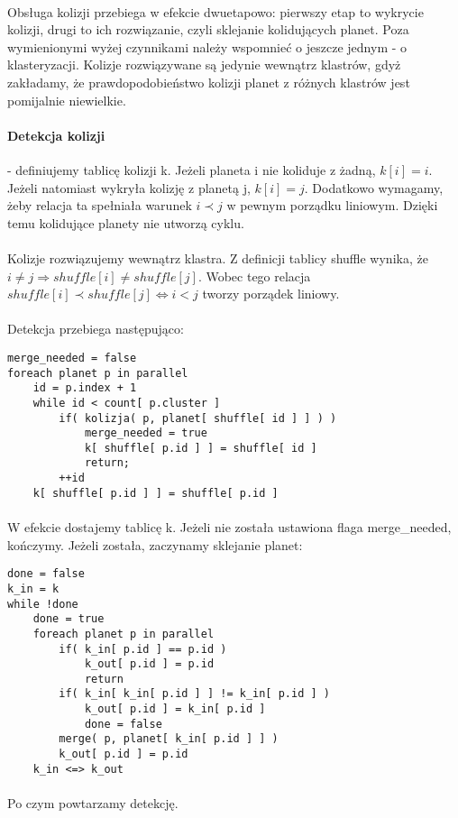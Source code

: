 \paragraph{} Obsługa kolizji przebiega w efekcie dwuetapowo: pierwszy etap to wykrycie kolizji, drugi to ich rozwiązanie, czyli sklejanie kolidujących planet. Poza wymienionymi wyżej czynnikami należy wspomnieć o jeszcze jednym - o klasteryzacji. Kolizje rozwiązywane są jedynie wewnątrz klastrów, gdyż zakładamy, że prawdopodobieństwo kolizji planet z różnych klastrów jest pomijalnie niewielkie.

\paragraph{Detekcja kolizji} - definiujemy tablicę kolizji k. Jeżeli planeta i nie koliduje z żadną, \ensuremath{k[i] = i}. Jeżeli natomiast wykryła kolizję z planetą j, \ensuremath{k[i] = j}. Dodatkowo wymagamy, żeby relacja ta spełniała warunek \ensuremath{i\prec j} w pewnym porządku liniowym. Dzięki temu kolidujące planety nie utworzą cyklu.

\paragraph{} Kolizje rozwiązujemy wewnątrz klastra.  Z definicji tablicy shuffle wynika, że \ensuremath{i \neq j \Rightarrow shuffle[i]\neq shuffle[j]}. Wobec tego relacja \ensuremath{shuffle[i] \prec shuffle[j] \Leftrightarrow i<j } tworzy porządek liniowy.

\paragraph{} Detekcja przebiega następująco:
\begin{lstlisting}
merge_needed = false
foreach planet p in parallel
	id = p.index + 1
	while id < count[ p.cluster ]
		if( kolizja( p, planet[ shuffle[ id ] ] ) )
			merge_needed = true
			k[ shuffle[ p.id ] ] = shuffle[ id ]
			return;
		++id
	k[ shuffle[ p.id ] ] = shuffle[ p.id ]
\end{lstlisting}

\paragraph{} W efekcie dostajemy tablicę k. Jeżeli nie została ustawiona flaga merge\_needed, kończymy. Jeżeli została, zaczynamy sklejanie planet:
\begin{lstlisting}
done = false
k_in = k
while !done
	done = true
	foreach planet p in parallel	
		if( k_in[ p.id ] == p.id )
			k_out[ p.id ] = p.id
			return
		if( k_in[ k_in[ p.id ] ] != k_in[ p.id ] )
			k_out[ p.id ] = k_in[ p.id ]
			done = false
		merge( p, planet[ k_in[ p.id ] ] )
		k_out[ p.id ] = p.id
	k_in <=> k_out
\end{lstlisting}

\paragraph{} Po czym powtarzamy detekcję.
